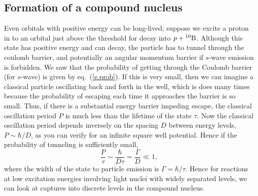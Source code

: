 \subsection{Formation of a compound nucleus}
Even orbitals with positive energy can be long-lived; suppose we excite a proton in \carbon[11] to an orbital just above the threshold for decay into $\pt + \boron[10]$.  Although this state has positive energy and can decay, the particle has to tunnel through the coulomb barrier, and potentially an angular momentum barrier if $s$-wave emission is forbidden.  We saw that the probability of getting through the Coulomb barrier (for $s$-wave) is given by eq.~(\ref{e.prob}).  If this is very small, then we can imagine a classical particle oscillating back and forth in the well, which is does many times because the probability of escaping each time it approaches the barrier is so small. Thus, if there is a substantial energy barrier impeding escape, the classical oscillation period $P$ is much less than the lifetime of the state $\tau$.  Now the classical oscillation period depends inversely on the spacing $D$ between energy levels, $P \sim \hbar/D$, as you can verify for an infinite square well potential.  Hence if the probability of tunneling is sufficiently small,
\[
 \frac{P}{\tau} \sim \frac{\hbar}{D\tau} = \frac{\Gamma}{D} \ll 1,
\]
where the width of the state to particle emission is $\Gamma = \hbar/\tau$.  Hence for reactions at low excitation energies involving light nuclei with widely separated levels, we can look at captures into discrete levels in the compound nucleus. 

